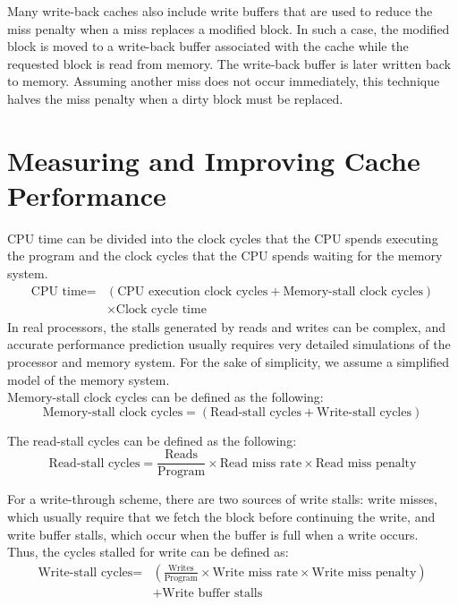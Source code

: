 \documentclass[12pt]{article}
\theoremstyle{definition}
\begin{document}
  Many write-back caches also include write buffers that are used to reduce the miss penalty when a miss replaces a modified block.
  In such a case, the modified block is moved to a write-back buffer associated with the cache while the requested block is read from memory.
  The write-back buffer is later written back to memory.
  Assuming another miss does not occur immediately, this technique halves the miss penalty when a dirty block must be replaced.

  \section{Measuring and Improving Cache Performance}
  CPU time can be divided into the clock cycles that the CPU spends executing the program and the clock cycles that the CPU spends waiting for the memory system.
  \begin{align*}
  \text{CPU time} = &(\text{CPU execution clock cycles} + \text{Memory-stall clock cycles}) \\
  &\times \text{Clock cycle time}
  \end{align*}
  In real processors, the stalls generated by reads and writes can be complex, and accurate performance prediction usually requires very detailed simulations of the processor and memory system.
  For the sake of simplicity, we assume a simplified model of the memory system. \\

  Memory-stall clock cycles can be defined as the following:
  $$\text{Memory-stall clock cycles} = (\text{Read-stall cycles} + \text{Write-stall cycles})$$

  The read-stall cycles can be defined as the following:
  $$\text{Read-stall cycles} = \frac{\text{Reads}}{\text{Program}} \times \text{Read miss rate} \times \text{Read miss penalty}$$

  For a write-through scheme, there are two sources of write stalls: write misses, which usually require that we fetch the block before continuing the write, and write buffer stalls, which occur when the buffer is full when a write occurs. \\
  Thus, the cycles stalled for write can be defined as:
  \begin{align*}
  \text{Write-stall cycles} = &\left( \frac{\text{Writes}}{\text{Program}} \times
  \text{Write miss rate} \times \text{Write miss penalty} \right) \\
  &+ \text{Write buffer stalls}
  \end{align*}
\end{document}
